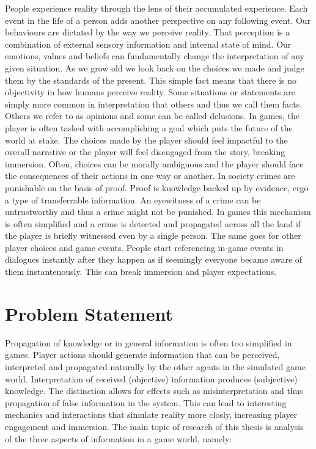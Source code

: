 \label{chapter:introduction}
People experience reality through the lens of their accumulated experience.
Each event in the life of a person adds another perspective on any following event.
Our behaviours are dictated by the way we perceive reality.
That perception is a combination of external sensory information and internal state of mind.
Our emotions, values and beliefs can fundamentally change the interpretation of any given situation.
As we grow old we look back on the choices we made and judge them by the standards of the present.
This simple fact means that there is no objectivity in how humans perceive reality.
Some situations or statements are simply more common in interpretation that others and thus we call them facts.
Others we refer to as opinions and some can be called delusions.
In games, the player is often tasked with accomplishing a goal which puts the future of the world at stake.
The choices made by the player should feel impactful to the overall narrative or the player will feel disengaged from the story, breaking immersion.
Often, choices can be morally ambiguous and the player should face the consequences of their actions in one way or another.
In society crimes are punishable on the basis of proof.
Proof is knowledge backed up by evidence, ergo a type of transferrable information.
An eyewitness of a crime can be untrustworthy and thus a crime might not be punished.
In games this mechanism is often simplified and a crime is detected and propagated across all the land if the player is briefly witnessed even by a single person.
The same goes for other player choices and game events.
People start referencing in-game events in dialogues instantly after they happen as if seemingly everyone became aware of them instantenously.
This can break immersion and player expectations.

\section{Problem Statement}
Propagation of knowledge or in general information is often too simplified in games.
Player actions should generate information that can be perceived, interpreted and propagated naturally by the other agents in the simulated game world.
Interpretation of received (objective) information produces (subjective) knowledge.
The distinction allows for effects such as misinterpretation and thus propagation of false information in the system.
This can lead to interesting mechanics and interactions that simulate reality more closly, increasing player engagement and immersion.
The main topic of research of this thesis is analysis of the three aspects of information in a game world, namely:

